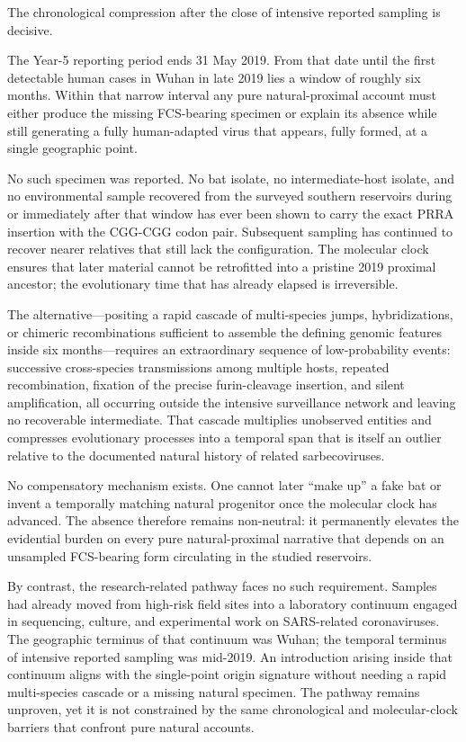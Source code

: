 The chronological compression after the close of intensive reported sampling is decisive.

The Year-5 reporting period ends 31 May 2019. From that date until the first detectable human cases in Wuhan in late 2019 lies a window of roughly six months. Within that narrow interval any pure natural-proximal account must either produce the missing FCS-bearing specimen or explain its absence while still generating a fully human-adapted virus that appears, fully formed, at a single geographic point.

No such specimen was reported. No bat isolate, no intermediate-host isolate, and no environmental sample recovered from the surveyed southern reservoirs during or immediately after that window has ever been shown to carry the exact PRRA insertion with the CGG-CGG codon pair. Subsequent sampling has continued to recover nearer relatives that still lack the configuration. The molecular clock ensures that later material cannot be retrofitted into a pristine 2019 proximal ancestor; the evolutionary time that has already elapsed is irreversible.

The alternative—positing a rapid cascade of multi-species jumps, hybridizations, or chimeric recombinations sufficient to assemble the defining genomic features inside six months—requires an extraordinary sequence of low-probability events: successive cross-species transmissions among multiple hosts, repeated recombination, fixation of the precise furin-cleavage insertion, and silent amplification, all occurring outside the intensive surveillance network and leaving no recoverable intermediate. That cascade multiplies unobserved entities and compresses evolutionary processes into a temporal span that is itself an outlier relative to the documented natural history of related sarbecoviruses.

No compensatory mechanism exists. One cannot later “make up” a fake bat or invent a temporally matching natural progenitor once the molecular clock has advanced. The absence therefore remains non-neutral: it permanently elevates the evidential burden on every pure natural-proximal narrative that depends on an unsampled FCS-bearing form circulating in the studied reservoirs.

By contrast, the research-related pathway faces no such requirement. Samples had already moved from high-risk field sites into a laboratory continuum engaged in sequencing, culture, and experimental work on SARS-related coronaviruses. The geographic terminus of that continuum was Wuhan; the temporal terminus of intensive reported sampling was mid-2019. An introduction arising inside that continuum aligns with the single-point origin signature without needing a rapid multi-species cascade or a missing natural specimen. The pathway remains unproven, yet it is not constrained by the same chronological and molecular-clock barriers that confront pure natural accounts.

